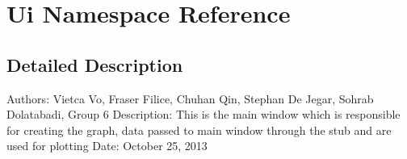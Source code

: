 \hypertarget{namespace_ui}{\section{Ui Namespace Reference}
\label{namespace_ui}
}


\subsection{Detailed Description}
Authors\-: Vietca Vo, Fraser Filice, Chuhan Qin, Stephan De Jegar, Sohrab Dolatabadi, Group 6 Description\-: This is the main window which is responsible for creating the graph, data passed to main window through the stub and are used for plotting Date\-: October 25, 2013 